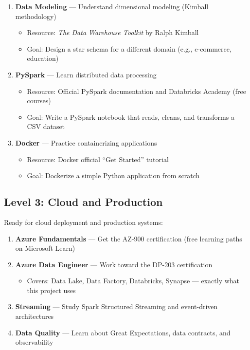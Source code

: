\documentclass[12pt, a4paper, oneside]{report}
\begin{document}
\begin{enumerate}[label=\textcolor{primary}{\textbf{\arabic*.}}]
    \item \textbf{Data Modeling} --- Understand dimensional modeling (Kimball methodology)
    \begin{itemize}
        \item Resource: \textit{The Data Warehouse Toolkit} by Ralph Kimball
        \item Goal: Design a star schema for a different domain (e.g., e-commerce, education)
    \end{itemize}
    \item \textbf{PySpark} --- Learn distributed data processing
    \begin{itemize}
        \item Resource: Official PySpark documentation and Databricks Academy (free courses)
        \item Goal: Write a PySpark notebook that reads, cleans, and transforms a CSV dataset
    \end{itemize}
    \item \textbf{Docker} --- Practice containerizing applications
    \begin{itemize}
        \item Resource: Docker official ``Get Started'' tutorial
        \item Goal: Dockerize a simple Python application from scratch
    \end{itemize}
\end{enumerate}

\subsection{Level 3: Cloud and Production}

Ready for cloud deployment and production systems:

\begin{enumerate}[label=\textcolor{primary}{\textbf{\arabic*.}}]
    \item \textbf{Azure Fundamentals} --- Get the AZ-900 certification (free learning paths on Microsoft Learn)
    \item \textbf{Azure Data Engineer} --- Work toward the DP-203 certification
    \begin{itemize}
        \item Covers: Data Lake, Data Factory, Databricks, Synapse --- exactly what this project uses
    \end{itemize}
    \item \textbf{Streaming} --- Study Spark Structured Streaming and event-driven architectures
    \item \textbf{Data Quality} --- Learn about Great Expectations, data contracts, and observability
\end{enumerate}
\end{document}
